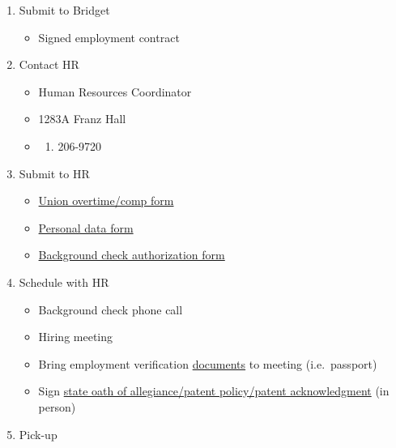 \documentclass[]{book}
\providecommand{\tightlist}{%
  \setlength{\itemsep}{0pt}\setlength{\parskip}{0pt}}
\begin{document}
\begin{enumerate}
\def\labelenumi{\arabic{enumi}.}
\tightlist
\item
  Submit to Bridget

  \begin{itemize}
  \tightlist
  \item
    Signed employment contract
  \end{itemize}
\item
  Contact HR

  \begin{itemize}
  \item
    Human Resources Coordinator
  \item
    1283A Franz Hall
  \item
    \begin{enumerate}
    \def\labelenumii{(\arabic{enumii})}
    \setcounter{enumii}{309}
    \tightlist
    \item
      206-9720
    \end{enumerate}
  \end{itemize}
\item
  Submit to HR

  \begin{itemize}
  \tightlist
  \item
    \href{https://ucla.app.box.com/s/z58tkq6l13qwl0zw5gtqhdxq0cne1wcu}{Union overtime/comp form}
  \item
    \href{https://ucla.app.box.com/s/7jmouwl8fbp5039qq4tfmreo5r5ydmjq}{Personal data form}
  \item
    \href{https://ucla.app.box.com/s/tothrcm0zcz50hj829bkcj1idclcudzr}{Background check authorization form}
  \end{itemize}
\item
  Schedule with HR

  \begin{itemize}
  \tightlist
  \item
    Background check phone call
  \item
    Hiring meeting
  \item
    Bring employment verification \href{https://ucla.app.box.com/s/iwguajwkedo2zf2lfr5ie3z5tc4vnz7m}{documents} to meeting (i.e.~passport)
  \item
    Sign \href{https://ucnet.universityofcalifornia.edu/forms/pdf/upay-585.pdf}{state oath of allegiance/patent policy/patent acknowledgment} (in person)
  \end{itemize}
\item
  Pick-up


\end{enumerate}
\end{document}
